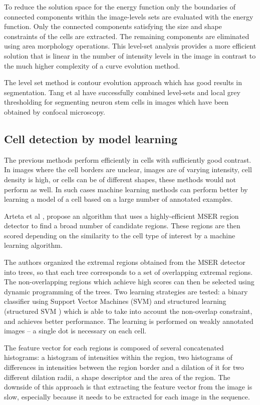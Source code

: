 \documentclass[12pt,a4paper,openany]{book}
\begin{document}
To reduce the solution space for the energy function only the boundaries of connected components within the image-levels sets are evaluated with the energy function. Only the connected components satisfying the size and shape constraints of the cells are extracted. The remaining components are eliminated using area morphology operations. This level-set analysis provides a more efficient solution that is linear in the number of intensity levels in the image in contrast to the much higher complexity of a curve evolution method.

The level set method is contour evolution approach which has good results in segmentation. Tang et al \cite{tang} have successfully combined level-sets and local grey thresholding \cite{xu10} for segmenting neuron stem cells in images which have been obtained by confocal microscopy.

\subsection{Cell detection by model learning}

The previous methods perform efficiently in cells with sufficiently good contrast. In images where the cell borders are unclear, images are of varying intensity, cell density is high, or cells can be of different shapes, these methods would not perform as well. In such cases machine learning methods can perform better by learning a model of a cell based on a large number of annotated examples.

Arteta et al \cite{arteta12}\cite{arteta13},  propose an algorithm that uses a highly-efficient MSER region detector \cite{matas02} to find a broad number of candidate regions. These regions are then scored depending on the similarity to the cell type of interest by a machine learning algorithm. 

The authors organized the extremal regions obtained from the MSER detector into trees, so that each tree corresponds to a set of overlapping extremal regions. The non-overlapping regions which achieve high scores can then be selected using dynamic programming of the trees. Two learning strategies are tested: a binary classifier using Support Vector Machines (SVM) and structured learning (structured SVM \cite{joachims09}) which is able to take into account the non-overlap constraint, and achieves better performance. The learning is performed on weakly annotated images -- a single dot is necessary on each cell.

The feature vector for each regions is composed of several concatenated histograms: a histogram of intensities within the region, two histograms of differences in intensities between the region border and a dilation of it for two different dilation radii, a shape descriptor and the area of the region. The downside of this approach is that extracting the feature vector from the image is slow, especially because it needs to be extracted for each image in the sequence.
\end{document}
